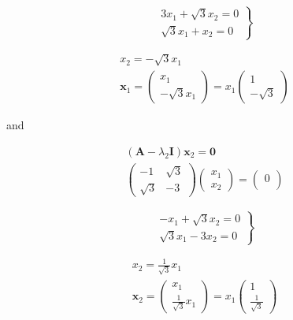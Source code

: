 \documentclass[12pt]{article}
\begin{document}
\begin{equation*}
	\left.\begin{array}{r}
		3 x_{1}+\sqrt{3} x_{2}=0 \\
		\sqrt{3} x_{1}+x_{2}=0
	\end{array}\right\}
\end{equation*}

\begin{equation*}
	\begin{array}{r}
		x_{2}=-\sqrt{3} x_{1} \\
		\mathbf{x}_{1}=\left(\begin{array}{c}
				x_{1} \\
				-\sqrt{3} x_{1}
			\end{array}\right)=x_{1}\left(\begin{array}{c}
				1 \\
				-\sqrt{3}
			\end{array}\right)
	\end{array}
\end{equation*}

and

\begin{equation*}
	\begin{array}{c}
		\left(\mathbf{A}-\lambda_{2} \mathbf{I}\right) \mathbf{x}_{2}=\mathbf{0} \\
		\left(\begin{array}{ll}
				-1       & \sqrt{3} \\
				\sqrt{3} & -3
			\end{array}\right)\left(\begin{array}{l}
				x_{1} \\
				x_{2}
			\end{array}\right)=\left(\begin{array}{l}
				0 \\

			\end{array}\right)
	\end{array}
\end{equation*}

\begin{equation*}
	\left.\begin{array}{r}
		-x_{1}+\sqrt{3} x_{2}=0 \\
		\sqrt{3} x_{1}-3 x_{2}=0
	\end{array}\right\}
\end{equation*}

\begin{equation*}
	\begin{array}{c}
		x_{2}=\frac{1}{\sqrt{3}} x_{1} \\
		\mathbf{x}_{2}=\left(\begin{array}{c}
				x_{1} \\
				\frac{1}{\sqrt{3}} x_{1}
			\end{array}\right)=x_{1}\left(\begin{array}{c}
				1 \\
				\frac{1}{\sqrt{3}}
			\end{array}\right)
	\end{array}
\end{equation*}
\end{document}
